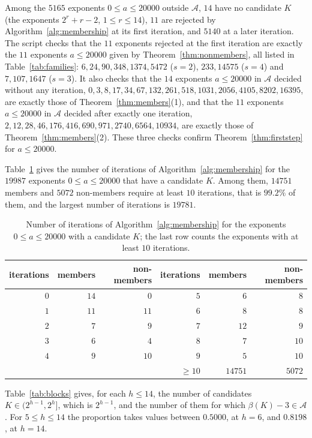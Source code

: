 \documentclass[11pt]{amsart}
\theoremstyle{definition}
\begin{document}
Among the $5165$ exponents $0\le a\le20000$ outside $\mathcal{A}$, $14$ have no candidate $K$ (the exponents $2^r+r-2$, $1\le r\le14$), $11$ are rejected by Algorithm~\ref{alg:membership} at its first iteration, and $5140$ at a later iteration. The script checks that the $11$ exponents rejected at the first iteration are exactly the $11$ exponents $a\le20000$ given by Theorem~\ref{thm:nonmembers}, all listed in Table~\ref{tab:families}: $6,24,90,348,1374,5472$ ($s=2$), $233,14575$ ($s=4$) and $7,107,1647$ ($s=3$). It also checks that the $14$ exponents $a\le20000$ in $\mathcal{A}$ decided without any iteration, $0,3,8,17,34,67,132,261,518,1031,2056,4105,8202,16395$, are exactly those of Theorem~\ref{thm:members}(1), and that the $11$ exponents $a\le20000$ in $\mathcal{A}$ decided after exactly one iteration, $2,12,28,46,176,416,690,971,2740,6564,10934$, are exactly those of Theorem~\ref{thm:members}(2). These three checks confirm Theorem~\ref{thm:firststep} for $a\le20000$.

Table~\ref{tab:iterations} gives the number of iterations of Algorithm~\ref{alg:membership} for the $19987$ exponents $0\le a\le20000$ that have a candidate $K$. Among them, $14751$ members and $5072$ non-members require at least $10$ iterations, that is $99.2\%$ of them, and the largest number of iterations is $19781$.

\begin{table}[H]
\centering
\caption{Number of iterations of Algorithm~\ref{alg:membership} for the exponents $0\le a\le20000$ with a candidate $K$; the last row counts the exponents with at least $10$ iterations.}
\label{tab:iterations}
\begin{tabular}{rrr@{\qquad}rrr}
\toprule
iterations & members & non-members & iterations & members & non-members\\
\midrule
$0$ & $14$ & $0$ & $5$ & $6$ & $8$\\
$1$ & $11$ & $11$ & $6$ & $8$ & $8$\\
$2$ & $7$ & $9$ & $7$ & $12$ & $9$\\
$3$ & $6$ & $4$ & $8$ & $7$ & $10$\\
$4$ & $9$ & $10$ & $9$ & $5$ & $10$\\
 & & & $\ge10$ & $14751$ & $5072$\\
\bottomrule
\end{tabular}
\end{table}

Table~\ref{tab:blocks} gives, for each $h\le14$, the number of candidates $K\in(2^{h-1},2^h]$, which is $2^{h-1}$, and the number of them for which $\beta(K)-3\in\mathcal{A}$. For $5\le h\le14$ the proportion takes values between $0.5000$, at $h=6$, and $0.8198$, at $h=14$.
\end{document}
